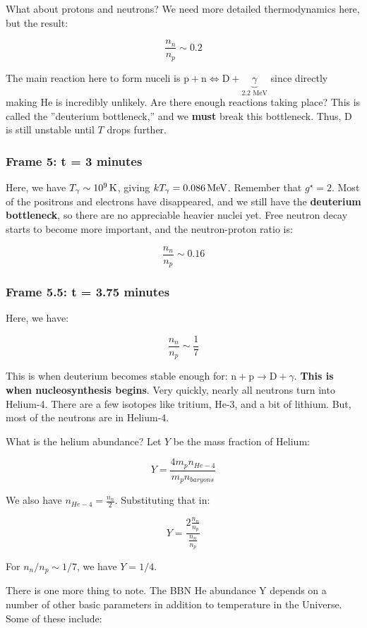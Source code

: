 \documentclass{article}
\newcommand{\unit}[1]{{\,\rm #1}}
\newcommand{\be}{\begin{equation}}
\newcommand{\ee}{\end{equation}}
\def\iff{\Leftrightarrow}
\def\iff{\Leftrightarrow}
\begin{document}
What about protons and neutrons? We need more detailed thermodynamics here, but the result:

\be
\frac{n_n}{n_p} \sim 0.2
\ee

The main reaction here to form nuceli is $\text{p} + \text{n} \iff \text{D} + \underbrace{\gamma}_\text{2.2 MeV}$ since directly making He is incredibly unlikely. Are there enough reactions taking place? This is called the ''deuterium bottleneck,'' and we \textbf{must} break this bottleneck. Thus, $\text{D}$ is still unstable until $T$ drops further. 


\subsubsection{Frame 5: t = 3 minutes}

Here, we have $T_\gamma \sim 10^{9} \unit{K}$, giving $kT_\gamma = 0.086 \unit{MeV}$. Remember that $g^\star = 2$. Most of the positrons and electrons have disappeared, and we still have the \textbf{deuterium bottleneck}, so there are no appreciable heavier nuclei yet. Free neutron decay starts to become more important, and the neutron-proton ratio is:

\be
\frac{n_n}{n_p} \sim 0.16
\ee


\subsubsection{Frame 5.5: t = 3.75 minutes}

Here, we have:

\be
\frac{n_n}{n_p} \sim \frac17
\ee

This is when deuterium becomes stable enough for: $\text{n} + \text{p} \rightarrow \text{D} + \gamma$. \textbf{This is when nucleosynthesis begins}. Very quickly, nearly all neutrons turn into Helium-4. There are a few isotopes like tritium, He-3, and a bit of lithium. But, most of the neutrons are in Helium-4.

What is the helium abundance? Let $Y$ be the mass fraction of Helium:

\be
Y = \frac{4m_p n_{He-4}}{m_p n_{baryons}}
\ee

We also have $n_{He-4} = \frac{n_n}{2}$. Substituting that in:

\be
Y = \frac{2 \frac{n_n}{n_p}}{\frac{n_n}{n_p}}
\ee

For $n_n / n_p \sim 1/7$, we have $\boxed{Y = 1/4}$. 


There is one more thing to note. The BBN He abundance Y depends on a number of other basic parameters in addition to temperature in the Universe. Some of these include:
\end{document}
